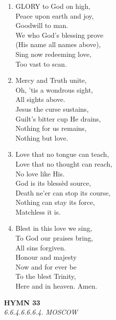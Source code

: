 \documentclass[11pt,a4paper]{article}
\begin{document}
\begin{enumerate}
    \item GLORY to God on high, \\
        Peace upon earth and joy, \\
        Goodwill to man. \\
        We who God's blessing prove \\
        (His name all names above), \\
        Sing now redeeming love, \\
        Too vast to scan.

    \item Mercy and Truth unite, \\
        Oh, 'tis a wondrous sight, \\
        All sights above. \\
        Jesus the curse sustains, \\
        Guilt's bitter cup He drains, \\
        Nothing for us remains, \\
        Nothing but love.

    \item Love that no tongue can teach, \\
        Love that no thought can reach, \\
        No love like His. \\
        God is its bless\`ed source, \\
        Death ne'er can stop its course, \\
        Nothing can stay its force, \\
        Matchless it is.

    \item Blest in this love we sing, \\
        To God our praises bring, \\
        All sins forgiven. \\
        Honour and majesty \\
        Now and for ever be \\
        To the blest Trinity, \\
        Here and in heaven. Amen.

\end{enumerate}

\newpage
\begin{center}
    {\Large \textbf{HYMN 33}}
    \\
    \textit{6.6.4.6.6.6.4. MOSCOW}
\end{center}
\vspace{1em}
\end{document}
